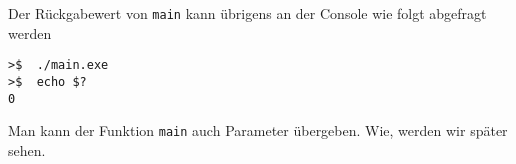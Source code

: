 Der Rückgabewert von \texttt{main} kann übrigens an der Console wie folgt abgefragt werden

\vspace*{0.5cm}
\begin{verbatim}
>$  ./main.exe
>$  echo $?
0
\end{verbatim}
\vspace*{0.5cm}

Man kann der Funktion \texttt{main} auch Parameter übergeben.
Wie, werden wir später sehen.
